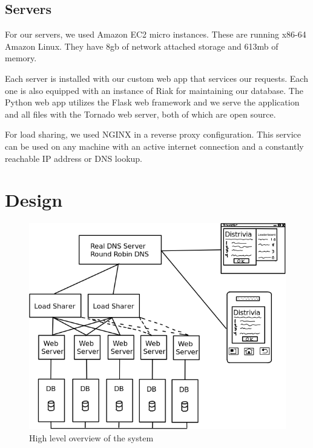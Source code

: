 \documentclass{dependencies/acm_proc_article-sp}
\begin{document}
\subsection{Servers}
For our servers, we used Amazon EC2 micro instances.
These are running x86-64 Amazon Linux.
They have 8gb of network attached storage and 613mb of memory.

Each server is installed with our custom web app that services our requests.
Each one is also equipped with an instance of Riak \cite{riak} for maintaining our database.
The Python web app utilizes the Flask web framework and we serve the application and all files with the Tornado web server, both of which are open source.

For load sharing, we used NGINX \cite{nginx} in a reverse proxy configuration.
This service can be used on any machine with an active internet connection and a constantly reachable IP address or DNS lookup.


\section{Design}
\begin{figure}[h!]
  \centering
    \includegraphics[scale=0.4]{diagram.png}
   \caption{High level overview of the system}
 \end{figure}
\end{document}
